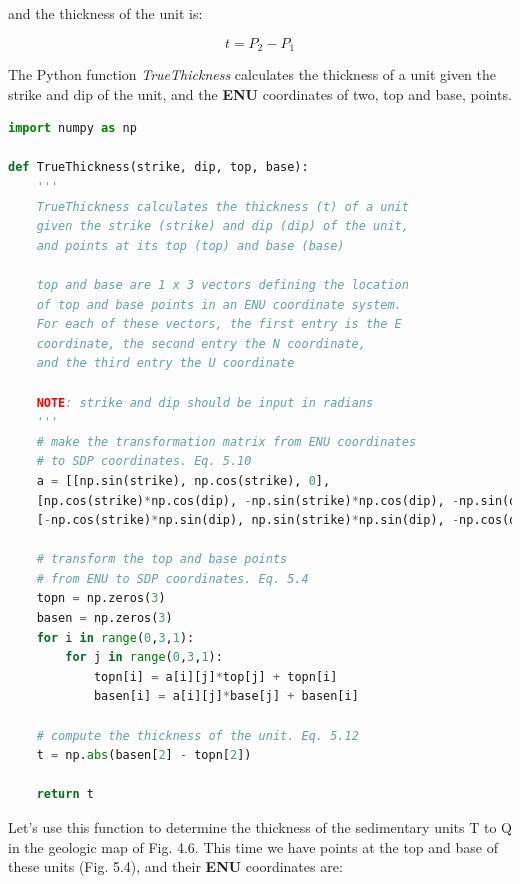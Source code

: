 \documentclass[a4paper , 12pt]{book}
\begin{document}
and the thickness of the unit is:

\begin{equation}
    t = P_2-P_1
\end{equation}{}

The Python function \textit{TrueThickness} calculates the thickness of a unit given the strike and dip of the unit, and the \textbf{ENU} coordinates of two, top and base, points.

\begin{lstlisting}[language=Python, frame=single]
import numpy as np

def TrueThickness(strike, dip, top, base):
    '''
    TrueThickness calculates the thickness (t) of a unit 
    given the strike (strike) and dip (dip) of the unit, 
    and points at its top (top) and base (base) 

    top and base are 1 x 3 vectors defining the location 
    of top and base points in an ENU coordinate system. 
    For each of these vectors, the first entry is the E 
    coordinate, the second entry the N coordinate, 
    and the third entry the U coordinate

    NOTE: strike and dip should be input in radians
    '''
    # make the transformation matrix from ENU coordinates 
    # to SDP coordinates. Eq. 5.10
    a = [[np.sin(strike), np.cos(strike), 0],
    [np.cos(strike)*np.cos(dip), -np.sin(strike)*np.cos(dip), -np.sin(dip)],
    [-np.cos(strike)*np.sin(dip), np.sin(strike)*np.sin(dip), -np.cos(dip)]]
    
    # transform the top and base points 
    # from ENU to SDP coordinates. Eq. 5.4 
    topn = np.zeros(3)
    basen = np.zeros(3)
    for i in range(0,3,1):
        for j in range(0,3,1):
            topn[i] = a[i][j]*top[j] + topn[i]
            basen[i] = a[i][j]*base[j] + basen[i]
    
    # compute the thickness of the unit. Eq. 5.12
    t = np.abs(basen[2] - topn[2])
    
    return t
\end{lstlisting}
 
Let's use this function to determine the thickness of the sedimentary units T to Q in the geologic map of Fig. 4.6. This time we have points at the top and base of these units (Fig. 5.4), and their \textbf{ENU} coordinates are:
\end{document}

